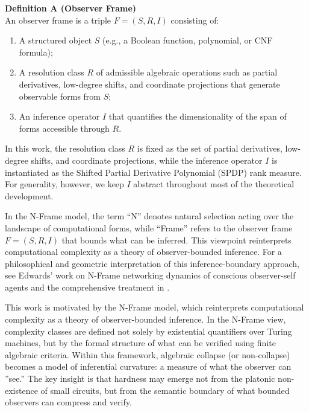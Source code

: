 \documentclass[12pt]{article}
\theoremstyle{definition}
\theoremstyle{definition}
\theoremstyle{remark}
\theoremstyle{remark}
\begin{document}
\begin{table}[h]
\centering
\caption{Observer Frame Definition}
\label{tab:symbols}
\begin{mdframed}[backgroundcolor=gray!5,linecolor=gray!75,linewidth=1pt]
\textbf{Definition A (Observer Frame)}\\[0.5em]
An observer frame is a triple $F = (S, R, I)$ consisting of:
\begin{enumerate}
\item A structured object $S$ (e.g., a Boolean function, polynomial, or CNF formula);
\item A resolution class $R$ of admissible algebraic operations such as partial derivatives, low-degree shifts, and coordinate projections that generate observable forms from $S$;
\item An inference operator $I$ that quantifies the dimensionality of the span of forms accessible through $R$.
\end{enumerate}
In this work, the resolution class $R$ is fixed as the set of partial derivatives, low-degree shifts, and coordinate projections, while the inference operator $I$ is instantiated as the Shifted Partial Derivative Polynomial (SPDP) rank measure. For generality, however, we keep $I$ abstract throughout most of the theoretical development.
\end{mdframed}
\end{table}

In the N-Frame model, the term ``N'' denotes natural selection acting over the landscape of computational forms, while ``Frame'' refers to the observer frame $F = (S, R, I)$ that bounds what can be inferred. This viewpoint reinterprets computational complexity as a theory of observer-bounded inference. For a philosophical and geometric interpretation of this inference-boundary approach, see Edwards' work on N-Frame networking dynamics of conscious observer-self agents \cite{edwards2025nframe} and the comprehensive treatment in \cite{edwards2026matrix}.

This work is motivated by the N-Frame model, which reinterprets computational complexity as a theory of observer-bounded inference. In the N-Frame view, complexity classes are defined not solely by existential quantifiers over Turing machines, but by the formal structure of what can be verified using finite algebraic criteria. Within this framework, algebraic collapse (or non-collapse) becomes a model of inferential curvature: a measure of what the observer can ''see.'' The key insight is that hardness may emerge not from the platonic non-existence of small circuits, but from the semantic boundary of what bounded observers can compress and verify.
\end{document}
